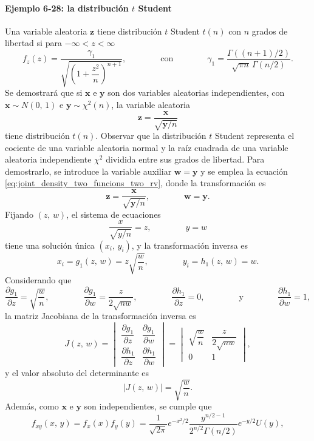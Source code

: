 \documentclass[a4paper]{report}
\newcommand{\x}{\mathbf{x}}
\newcommand{\y}{\mathbf{y}}
\newcommand{\w}{\mathbf{w}}
\newcommand{\z}{\mathbf{z}}
\begin{document}
\paragraph{Ejemplo 6-28: la distribución \(t\) Student} Una variable aleatoria \(\z\) tiene distribución \(t\) Student \(t(n)\) con \(n\) grados de libertad si para \(-\infty<z<\infty\)
\begin{equation}\label{eq:t_student_distribution}
  f_z(z)=\dfrac{\gamma_1}{\sqrt{\left(1+\dfrac{z^2}{n}\right)^{n+1}}},
  \qquad\qquad\textrm{con}\qquad\qquad
 \gamma_1=\frac{\Gamma((n+1)/2)}{\sqrt{\pi n}\,\Gamma(n/2)}.
\end{equation}
Se demostrará que si \(\x\) e \(\y\) son dos variables aleatorias independientes, con \(\x\sim N(0,\,1)\) e \(\y\sim\chi^2(n)\), la variable aleatoria
\[
 \z=\frac{\x}{\sqrt{\y/n}}
\]
tiene distribución \(t(n)\). Observar que la distribución \(t\) Student representa el cociente de una variable aleatoria normal y la raíz cuadrada de una variable aleatoria independiente \(\chi^2\) dividida entre sus grados de libertad. Para demostrarlo, se introduce la variable auxiliar \(\w=\y\) y se emplea la ecuación \ref{eq:joint_density_two_funcions_two_rv}, donde la transformación es
\[
 \z=\frac{\x}{\sqrt{\y/n}},\qquad\qquad \w=\y.
\]
Fijando \((z,\,w)\), el sistema de ecuaciones
\[
 \frac{x}{\sqrt{y/n}}=z,\qquad\qquad y=w
\]
tiene una solución única \((x_i,\,y_i)\), y la transformación inversa es
\[
 x_i=g_1(z,\,w)=z\sqrt{\frac{w}{n}},\qquad\qquad y_i=h_1(z,\,w)=w.
\]
Considerando que 
\[
 \frac{\partial g_1}{\partial z}=\sqrt{\frac{w}{n}},\qquad\qquad\frac{\partial g_1}{\partial w}=\frac{z}{2\sqrt{nw}},\qquad\qquad \frac{\partial h_1}{\partial z}=0,\qquad\qquad\textrm{y}\qquad\qquad\frac{\partial h_1}{\partial w}=1,
\]
la matriz Jacobiana de la transformación inversa es
\begingroup
\renewcommand*{\arraystretch}{2.2}
\[
 J(z,\,w)=
 \begin{vmatrix}
    \dfrac{\partial g_1}{\partial z} & \dfrac{\partial g_1}{\partial w} \\
    \dfrac{\partial h_1}{\partial z} & \dfrac{\partial h_1}{\partial w}
\end{vmatrix}=
 \begin{vmatrix}
    \sqrt{\dfrac{w}{n}} & \dfrac{z}{2\sqrt{nw}} \\
    0 & 1
\end{vmatrix},
\]
\endgroup
y el valor absoluto del determinante es
\[
 |J(z,\,w)|=\sqrt{\dfrac{w}{n}}.
\]
Además, como \(\x\) e \(\y\) son independientes, se cumple que 
\[
 f_{xy}(x,\,y)=f_x(x)f_y(y)=\frac{1}{\sqrt{2\pi}}e^{-x^2/2}\frac{y^{n/2-1}}{2^{n/2}\Gamma(n/2)}e^{-y/2}U(y),
\]
\end{document}
